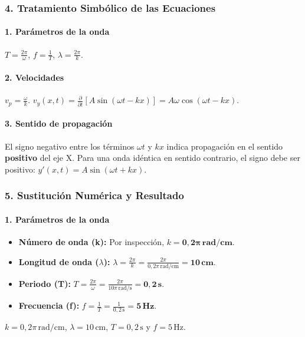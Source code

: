 \subsubsection*{4. Tratamiento Simbólico de las Ecuaciones}
\paragraph{1. Parámetros de la onda}
$ T = \frac{2\pi}{\omega} $, $ f = \frac{1}{T} $, $ \lambda = \frac{2\pi}{k} $.
\paragraph{2. Velocidades}
$ v_p = \frac{\omega}{k} $.
$ v_y(x,t) = \frac{\partial}{\partial t} [A\sin(\omega t - kx)] = A\omega\cos(\omega t - kx) $.
\paragraph{3. Sentido de propagación}
El signo negativo entre los términos $\omega t$ y $kx$ indica propagación en el sentido \textbf{positivo} del eje X. Para una onda idéntica en sentido contrario, el signo debe ser positivo: $y'(x,t) = A\sin(\omega t + kx)$.

\subsubsection*{5. Sustitución Numérica y Resultado}
\paragraph{1. Parámetros de la onda}
\begin{itemize}
    \item \textbf{Número de onda (k):} Por inspección, $k = \boldsymbol{0,2\pi \, \textbf{rad/cm}}$.
    \item \textbf{Longitud de onda ($\lambda$):} $\lambda = \frac{2\pi}{k} = \frac{2\pi}{0,2\pi \, \text{rad/cm}} = \boldsymbol{10 \, \textbf{cm}}$.
    \item \textbf{Periodo (T):} $T = \frac{2\pi}{\omega} = \frac{2\pi}{10\pi \, \text{rad/s}} = \boldsymbol{0,2 \, \textbf{s}}$.
    \item \textbf{Frecuencia (f):} $f = \frac{1}{T} = \frac{1}{0,2 \, \text{s}} = \boldsymbol{5 \, \textbf{Hz}}$.
\end{itemize}
\begin{cajaresultado}
    $k=0,2\pi\,\text{rad/cm}$, $\lambda=10\,\text{cm}$, $T=0,2\,\text{s}$ y $f=5\,\text{Hz}$.
\end{cajaresultado}


